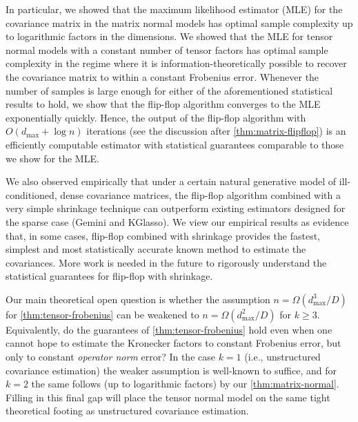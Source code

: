 \documentclass[aos]{imsart}
\theoremstyle{definition}
\numberwithin{equation}{section}
\def\dmax{d_{\max}}
\begin{document}
In particular, we showed that the maximum likelihood estimator (MLE) for the covariance matrix in the matrix normal models has optimal sample complexity up to logarithmic factors in the dimensions.
We showed that the MLE for tensor normal models with a constant number of tensor factors has optimal sample complexity in the regime where it is information-theoretically possible to recover the covariance matrix to within a constant Frobenius error.
Whenever the number of samples is large enough for either of the aforementioned statistical results to hold, we show that the flip-flop algorithm converges to the MLE exponentially quickly.
Hence, the output of the flip-flop algorithm with $O\left(\dmax +  \log n \right)$ iterations (see the discussion after \cref{thm:matrix-flipflop}) is an efficiently computable estimator with statistical guarantees comparable to those we show for the MLE.

We also observed empirically that under a certain natural generative model of ill-conditioned, dense covariance matrices, the flip-flop algorithm combined with a very simple shrinkage technique can outperform existing estimators designed for the sparse case (Gemini and KGlasso).
We view our empirical results as evidence that, in some cases, flip-flop combined with shrinkage provides the fastest, simplest and most statistically accurate known method to estimate the covariances.
More work is needed in the future to rigorously understand the statistical guarantees for flip-flop with shrinkage.


Our main theoretical open question is whether the assumption $n = \Omega( \dmax^3/ D)$ for \cref{thm:tensor-frobenius} can be weakened to $n = \Omega( \dmax^2/ D)$ for $k \geq 3$.
Equivalently, do the guarantees of \cref{thm:tensor-frobenius} hold even when one cannot hope to estimate the Kronecker factors to constant Frobenius error, but only to constant \emph{operator norm} error?
In the case $k = 1$ (i.e., unstructured covariance estimation) the weaker assumption is well-known to suffice, and for $k = 2$ the same follows (up to logarithmic factors) by our \cref{thm:matrix-normal}.
Filling in this final gap will place the tensor normal model on the same tight theoretical footing as unstructured covariance estimation.
\end{document}
